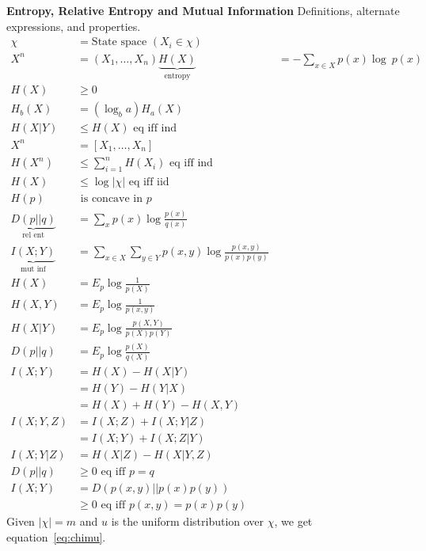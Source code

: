 \documentclass[10pt]{article}
\begin{document}
\begin{tiny}
\begin{multicols}{3}



\fontsize{5.75pt}{5pt}

\textbf{\scriptsize Entropy, Relative Entropy and Mutual Information}
Definitions, alternate expressions, and properties.
\begin{align}
\chi &= \text{State space } (X_i \in \chi)\\
X^n &=(X_1,\ldots,X_n)
\underbrace{H(X)}_\text{entropy}&= -\sum_{x\in X} p(x) \log\ p(x) \label{eq:entropy}\\
H(X)& \geq 0\\
H_b(X)&= (\log_b a)H_a(X)\\
H(X|Y)& \leq  H(X)\text{ eq iff ind} \label{eq:conditioning}\\
X^n&=[X_1,\ldots,X_n]\\
H(X^n)& \leq \sum_{i=1}^n H(X_i)\text{ eq iff ind} \label{eq:jointsum}\\
H(X)&\leq  \log |\chi|  \text{ eq iff iid}\label{eq:alphabetentropy}\\
H(p)&\text{ is concave in $p$}\\
\underbrace{D(p||q)}_\text{rel ent} & = \sum_x p(x) \log \frac{p(x)}{q(x)}\\
\underbrace{I(X;Y)}_\text{mut inf} & = \sum_{x\in X} \sum_{y \in Y} p(x,y) \log \frac{p(x,y)}{p(x)p(y)}\\
H(X)&=E_p \log \frac{1}{p(X)}\\
H(X,Y)&=E_p\log \frac{1}{p(x,y)}\\
H(X|Y)&=E_p\log \frac{p(X,Y)}{p(X)p(Y)}\\
D(p||q)&=E_p\log \frac{p(X)}{q(X)}\\
I(X;Y)&=H(X)-H(X|Y)\\
&=H(Y)-H(Y|X)\\
&=H(X)+H(Y)-H(X,Y)\\
I(X;Y,Z) &= I(X;Z) + I(X;Y|Z) \\
&= I(X;Y) + I(X;Z|Y)\\
I(X;Y|Z) &= H(X|Z) - H(X|Y,Z) \\
D(p||q)&\geq 0 \text{ eq iff $p=q$}\\
I(X;Y)&=D(p(x,y)||p(x)p(y))\\
	&\geq 0 \text{ eq iff $p(x,y)=p(x)p(y)$}
\end{align}
Given $|\chi|=m$ and $u$ is the uniform distribution over $\chi$, we get equation~\ref{eq:chimu}.
\begin{align}

\end{align}
\end{multicols}
\end{tiny}
\end{document}
